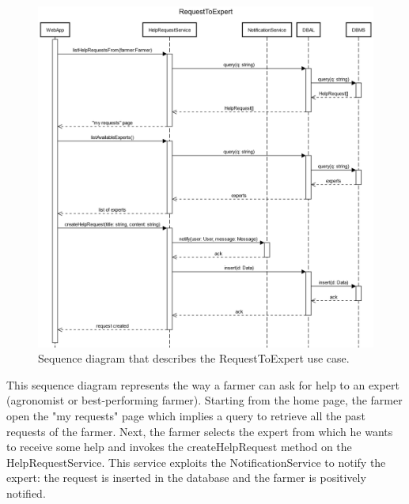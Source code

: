\documentclass{article}
\begin{document}
\newpage
\begin{figure}[H]
   \centering
   \includegraphics[scale=0.40]{diagrams/sequence diagrams/RequestToExpert.png}
    \caption{Sequence diagram that describes the RequestToExpert use case.}
\end{figure}
This sequence diagram represents the way a farmer can ask for help to an expert (agronomist or best-performing farmer). Starting from the home page, the farmer open the "my requests" page which implies a query to retrieve all the past requests of the farmer. Next, the farmer selects the expert from which he wants to receive some help and invokes the createHelpRequest method on the HelpRequestService. This service exploits the NotificationService to notify the expert: the request is inserted in the database and the farmer is positively notified.
\end{document}

